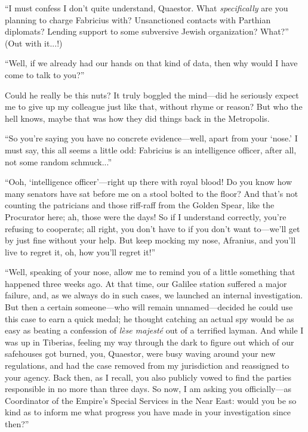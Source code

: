 ``I must confess I don't quite understand, Quaestor. What \emph{specifically} are you planning to charge Fabricius with? Unsanctioned contacts with Parthian diplomats? Lending support to some subversive Jewish organization? What?'' (Out with it...!)

``Well, if we already had our hands on that kind of data, then why would I have come to talk to you?'' 

Could he really be this nuts? It truly boggled the mind---did he seriously expect me to give up my colleague just like that, without rhyme or reason? But who the hell knows, maybe that was how they did things back in the Metropolis.

``So you're saying you have no concrete evidence---well, apart from your `nose.' I must say, this all seems a little odd: Fabricius is an intelligence officer, after all, not some random schmuck...''

``Ooh, `intelligence officer'---right up there with royal blood! Do you know how many senators have sat before me on a stool bolted to the floor? And that's not counting the patricians and those riff-raff from the Golden Spear, like the Procurator here; ah, those were the days! So if I understand correctly, you're refusing to cooperate; all right, you don't have to if you don't want to---we'll get by just fine without your help. But keep mocking my nose, Afranius, and you'll live to regret it, oh, how you'll regret it!''

``Well, speaking of your nose, allow me to remind you of a little something that happened three weeks ago. At that time, our Galilee station suffered a major failure, and, as we always do in such cases, we launched an internal investigation. But then a certain someone---who will remain unnamed---decided he could use this case to earn a quick medal; he thought catching an actual spy would be as easy as beating a confession of \emph{lèse majesté} out of a terrified layman. And while I was up in Tiberias, feeling my way through the dark to figure out which of our safehouses got burned, you, Quaestor, were busy waving around your new regulations, and had the case removed from my jurisdiction and reassigned to your agency. Back then, as I recall, you also publicly vowed to find the parties responsible in no more than three days. So now, I am asking you officially---as Coordinator of the Empire's Special Services in the Near East: would you be so kind as to inform me what progress you have made in your investigation since then?''

